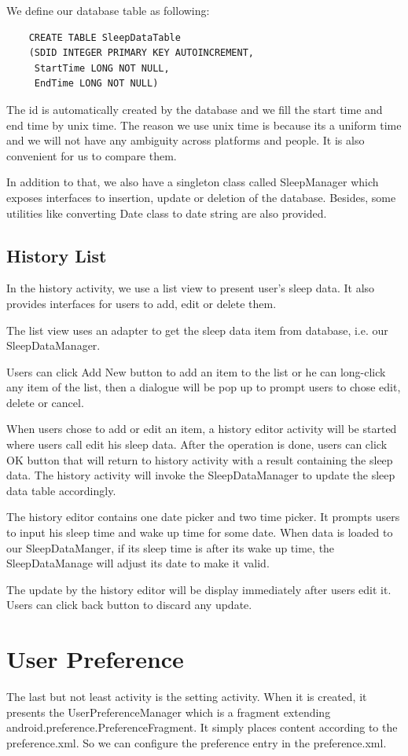 \documentclass[14pt]{extreport}
\begin{document}
We define our database table as following:
\begin{verbatim}
    CREATE TABLE SleepDataTable
    (SDID INTEGER PRIMARY KEY AUTOINCREMENT, 
     StartTime LONG NOT NULL,
     EndTime LONG NOT NULL)
\end{verbatim}
The id is automatically created by the database and we fill the start time and end time by unix time. The reason we use unix time is because its a uniform time and we will not have any ambiguity across platforms and people. It is also convenient for us to compare them.

In addition to that, we also have a singleton class called SleepManager which exposes interfaces to insertion, update or deletion of the database. Besides, some utilities like converting Date class to date string are also provided.

\section{History List}
In the history activity, we use a list view to present user's sleep data. It also provides interfaces for users to add, edit or delete them.

The list view uses an adapter to get the sleep data item from database, i.e. our SleepDataManager.

Users can click Add New button to add an item to the list or he can long-click any item of the list, then a dialogue will be pop up to prompt users to chose edit, delete or cancel. 

When users chose to add or edit an item, a history editor activity will be started where users call edit his sleep data. After the operation is done, users can click OK button that will return to history activity with a result containing the sleep data. The history activity will invoke the SleepDataManager to update the sleep data table accordingly. 

The history editor contains one date picker and two time picker. It prompts users to input his sleep time and wake up time for some date. When data is loaded to our SleepDataManger, if its sleep time is after its wake up time, the SleepDataManage will adjust its date to make it valid.

The update by the history editor will be display immediately after users edit it. Users can click back button to discard any update.

\chapter{User Preference}
The last but not least activity is the setting activity. When it is created, it presents the UserPreferenceManager which is a fragment extending android.preference.PreferenceFragment. It simply places content according to the preference.xml. So we can configure the preference entry in the preference.xml.
\end{document}
